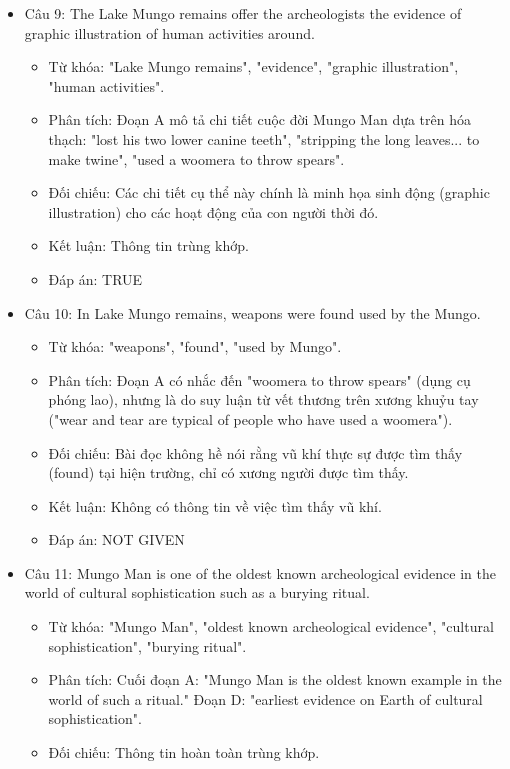 \documentclass{../templateReading/cdreading}
\begin{document}
\begin{itemize}
\item Câu 9: The Lake Mungo remains offer the archeologists the evidence of graphic illustration of human activities around.
\begin{itemize}
\item Từ khóa: "Lake Mungo remains", "evidence", "graphic illustration", "human activities".
\item Phân tích: Đoạn A mô tả chi tiết cuộc đời Mungo Man dựa trên hóa thạch: "lost his two lower canine teeth", "stripping the long leaves... to make twine", "used a woomera to throw spears".
\item Đối chiếu: Các chi tiết cụ thể này chính là minh họa sinh động (graphic illustration) cho các hoạt động của con người thời đó.
\item Kết luận: Thông tin trùng khớp.
\item Đáp án: TRUE
\end{itemize}
\item Câu 10: In Lake Mungo remains, weapons were found used by the Mungo.
\begin{itemize}
\item Từ khóa: "weapons", "found", "used by Mungo".
\item Phân tích: Đoạn A có nhắc đến "woomera to throw spears" (dụng cụ phóng lao), nhưng là do suy luận từ vết thương trên xương khuỷu tay ("wear and tear are typical of people who have used a woomera").
\item Đối chiếu: Bài đọc không hề nói rằng vũ khí thực sự được tìm thấy (found) tại hiện trường, chỉ có xương người được tìm thấy.
\item Kết luận: Không có thông tin về việc tìm thấy vũ khí.
\item Đáp án: NOT GIVEN
\end{itemize}
\item Câu 11: Mungo Man is one of the oldest known archeological evidence in the world of cultural sophistication such as a burying ritual.
\begin{itemize}
\item Từ khóa: "Mungo Man", "oldest known archeological evidence", "cultural sophistication", "burying ritual".
\item Phân tích: Cuối đoạn A: "Mungo Man is the oldest known example in the world of such a ritual." Đoạn D: "earliest evidence on Earth of cultural sophistication".
\item Đối chiếu: Thông tin hoàn toàn trùng khớp.

\end{itemize}
\end{itemize}
\end{document}
